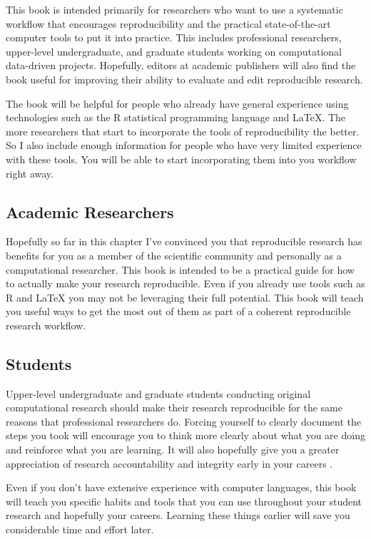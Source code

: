 This book is intended primarily for researchers who want to use a systematic workflow that encourages reproducibility and the practical state-of-the-art computer tools to put it into practice. This includes professional researchers, upper-level undergraduate, and graduate students working on computational data-driven projects. Hopefully, editors at academic publishers will also find the book useful for improving their ability to evaluate and edit reproducible research. 

The book will be helpful for people who already have general experience using technologies such as the R statistical programming language and LaTeX. The more researchers that start to incorporate the tools of reproducibility the better. So I also include enough information for people who have very limited experience with these tools. You will be able to start incorporating them into you workflow right away.

\subsection{Academic Researchers}
Hopefully so far in this chapter I've convinced you that reproducible research has benefits for you as a member of the scientific community and personally as a computational researcher. This book is intended to be a practical guide for how to actually make your research reproducible. Even if you already use tools such as R and LaTeX you may not be leveraging their full potential. This book will teach you useful ways to get the most out of them as part of a coherent reproducible research workflow.

\subsection{Students}
Upper-level undergraduate and graduate students conducting original computational research should make their research reproducible for the same reasons that professional researchers do. Forcing yourself to clearly document the steps you took will encourage you to think more clearly about what you are doing and reinforce what you are learning. It will also hopefully give you a greater appreciation of research accountability and integrity early in your careers \cite[183]{Barr2012,Ball2012}.

Even if you don't have extensive experience with computer languages, this book will teach you specific habits and tools that you can use throughout your student research and hopefully your careers. Learning these things earlier will save you considerable time and effort later.

